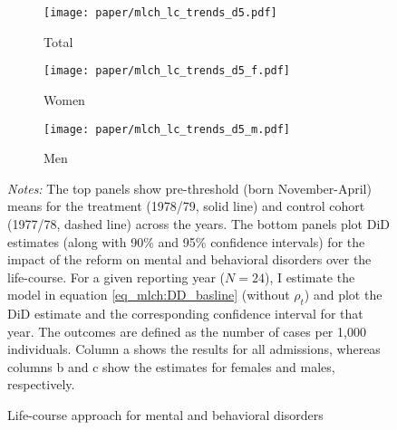 \begin{landscape}
	\vspace*{\fill}
	\begin{figure}[H]\centering
		\begin{subfigure}[h]{0.31\linewidth}\centering\caption{Total}
			\texttt{[image: paper/mlch\_lc\_trends\_d5.pdf]}
		\end{subfigure}
		\begin{subfigure}[h]{0.31\linewidth}\centering\caption{Women}
			\texttt{[image: paper/mlch\_lc\_trends\_d5\_f.pdf]}
		\end{subfigure}
		\begin{subfigure}[h]{0.31\linewidth}\centering\caption{Men}
			\texttt{[image: paper/mlch\_lc\_trends\_d5\_m.pdf]}
		\end{subfigure}
		\scriptsize
		\begin{minipage}{\linewidth}
			\caption{Life-course approach for mental and behavioral disorders}\label{fig_mlch: lc_d5_frg_DD}
			\emph{Notes:} The top panels show pre-threshold (born November-April) means for the treatment (1978/79, solid line) and control cohort (1977/78, dashed line) across the years. The bottom panels plot DiD estimates (along with 90\% and 95\% confidence intervals) for the impact of the reform on mental and behavioral disorders over the life-course. For a given reporting year ($N=24$), I estimate the model in equation \ref{eq_mlch:DD_basline} (without $\rho_t$) and plot the DiD estimate and the corresponding confidence interval for that year. The outcomes are defined as the number of cases per 1,000 individuals. Column a shows the results for all admissions, whereas columns b and c show the estimates for females and males, respectively.
		\end{minipage}
	\end{figure}
	\vspace*{\fill}\clearpage
\end{landscape}
